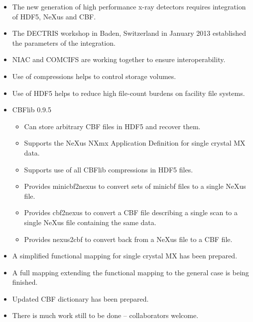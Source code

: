 \documentclass[11pt]{a0poster}
\begin{document}
\begin{minipage}[]{0.29\linewidth}
\vspace{-2mm}
\begin{itemize}
\item{The new generation of high performance x-ray detectors requires
    integration of HDF5, NeXus and CBF.}
\vspace{-2mm}
\item{The DECTRIS workshop in Baden, Switzerland in January 2013
    established the parameters of the integration.} 
\vspace{-2mm}
\item{NIAC and COMCIFS are working together to ensure interoperability.}
\vspace{-2mm}
\item{Use of compressions helps to control storage volumes.}
\vspace{-2mm}
\item{Use of HDF5 helps to reduce high file-count burdens on facility file systems.}
\vspace{-2mm}
\item{CBFlib 0.9.5
\vspace{-2mm}
\begin{itemize}
\item{Can store arbitrary CBF files in HDF5 and recover them.}
\vspace{-2mm}
\item{Supports the NeXus NXmx Application Definition for single crystal MX data.} 
\vspace{-2mm}
\item{Supports use of all CBFlib compressions in HDF5 files.}
\vspace{-2mm}
\item{Provides minicbf2nexus to convert sets of minicbf files to a single NeXus file.}
\vspace{-2mm}
\item{Provides cbf2nexus to convert a CBF file describing a single scan to a single NeXus file containing the same data.}
\vspace{-2mm}
\item{Provides nexus2cbf to convert back from a NeXus file to a CBF file.}
\end{itemize}}
\vspace{-2mm}
\item{A simplified functional mapping for single crystal MX has been prepared.}
\vspace{-2mm}
\item{A full mapping extending the functional mapping to the general case is being finished.}
\vspace{-2mm}
\item{Updated CBF dictionary has been prepared.}
\vspace{-2mm}
\item{There is much work still to be done -- collaborators welcome.}
\end{itemize}
\vspace{-10mm}%


\end{minipage}
\end{document}
